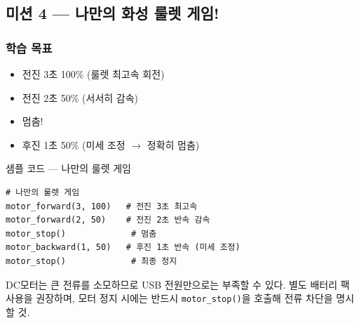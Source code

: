 \subsection{미션 4 --- 나만의 화성 룰렛 게임!}
\label{subsec:ch07-m4}

\begin{storybox}
\end{storybox}

\subsubsection*{학습 목표}
\begin{itemize}[leftmargin=1.4em]
  \item 전진 3초 100\% (룰렛 최고속 회전)
  \item 전진 2초 50\% (서서히 감속)
  \item 멈춤!
  \item 후진 1초 50\% (미세 조정 $\rightarrow$ 정확히 멈춤)
\end{itemize}

\begin{labbox}{샘플 코드 --- 나만의 룰렛 게임}
\begin{verbatim}
# 나만의 룰렛 게임
motor_forward(3, 100)   # 전진 3초 최고속
motor_forward(2, 50)    # 전진 2초 반속 감속
motor_stop()             # 멈춤
motor_backward(1, 50)   # 후진 1초 반속 (미세 조정)
motor_stop()             # 최종 정지
\end{verbatim}
\end{labbox}

\begin{caution}
DC모터는 큰 전류를 소모하므로 USB 전원만으로는 부족할 수 있다. 별도
배터리 팩 사용을 권장하며, 모터 정지 시에는 반드시 \texttt{motor\_stop()}을
호출해 전류 차단을 명시할 것.
\end{caution}
